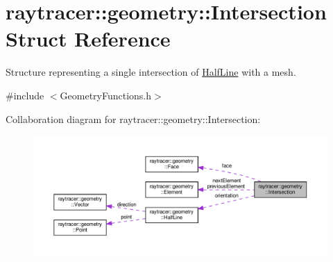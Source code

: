 \hypertarget{structraytracer_1_1geometry_1_1Intersection}{}\section{raytracer\+:\+:geometry\+:\+:Intersection Struct Reference}
\label{structraytracer_1_1geometry_1_1Intersection}


Structure representing a single intersection of \hyperlink{structraytracer_1_1geometry_1_1HalfLine}{Half\+Line} with a mesh.  




{\ttfamily \#include $<$Geometry\+Functions.\+h$>$}



Collaboration diagram for raytracer\+:\+:geometry\+:\+:Intersection\+:\nopagebreak
\begin{figure}[H]
\begin{center}
\leavevmode
\includegraphics[width=350pt]{structraytracer_1_1geometry_1_1Intersection__coll__graph}
\end{center}
\end{figure}
